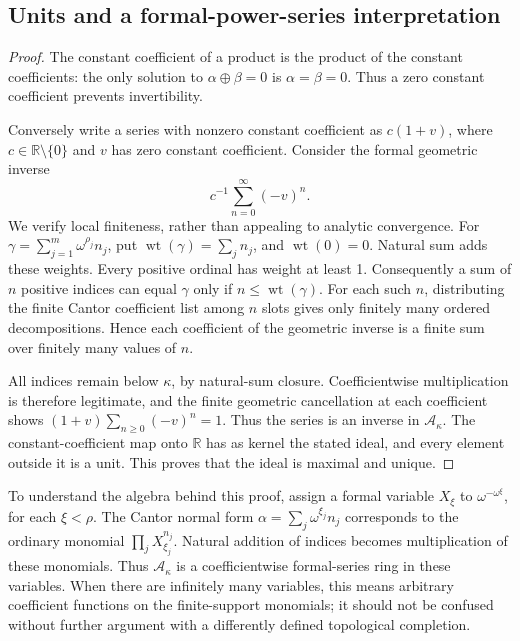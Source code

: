 \documentclass[11pt,letterpaper]{article}
\newtheorem{proposition}[theorem]{Proposition}
\theoremstyle{definition}
\theoremstyle{remark}
\newcommand{\R}{\mathbb{R}}
\newcommand{\A}{\mathscr{A}}
\newcommand{\ns}{\mathbin{\oplus}}
\DeclareMathOperator{\wt}{wt}
\begin{document}
\subsection{Units and a formal-power-series interpretation}
\begin{proof}
The constant coefficient of a product is the product of the constant
coefficients: the only solution to \(\alpha\ns\beta=0\) is
\(\alpha=\beta=0\). Thus a zero constant coefficient prevents
invertibility.

Conversely write a series with nonzero constant coefficient as
\(c(1+v)\), where \(c\in\R\setminus\{0\}\) and \(v\) has zero
constant coefficient. Consider the formal geometric inverse
\[
 c^{-1}\sum_{n=0}^{\infty}(-v)^n.
\]
We verify local finiteness, rather than appealing to analytic convergence.
For \(\gamma=\sum_{j=1}^m\omega^{\rho_j}n_j\), put
\(\wt(\gamma)=\sum_j n_j\), and \(\wt(0)=0\). Natural sum adds
these weights. Every positive ordinal has weight at least 1. Consequently
a sum of \(n\) positive indices can equal \(\gamma\) only if
\(n\leq\wt(\gamma)\). For each such \(n\), distributing the finite
Cantor coefficient list among \(n\) slots gives only finitely many
ordered decompositions. Hence each coefficient of the geometric inverse
is a finite sum over finitely many values of \(n\).

All indices remain below \(\kappa\), by natural-sum closure.
Coefficientwise multiplication is therefore legitimate, and the finite
geometric cancellation at each coefficient shows
\((1+v)\sum_{n\geq0}(-v)^n=1\). Thus the series is an inverse in
\(\A_\kappa\). The constant-coefficient map onto \(\R\) has as kernel
the stated ideal, and every element outside it is a unit. This proves
that the ideal is maximal and unique.
\end{proof}

To understand the algebra behind this proof, assign a formal variable
\(X_\xi\) to \(\omega^{-\omega^\xi}\), for each \(\xi<\rho\).
The Cantor normal form
\(\alpha=\sum_j\omega^{\xi_j}n_j\) corresponds to the ordinary monomial
\(\prod_j X_{\xi_j}^{n_j}\). Natural addition of indices becomes
multiplication of these monomials. Thus \(\A_\kappa\) is a
coefficientwise formal-series ring in these variables. When there are
infinitely many variables, this means arbitrary coefficient functions on
the finite-support monomials; it should not be confused without further
argument with a differently defined topological completion.
\end{document}
